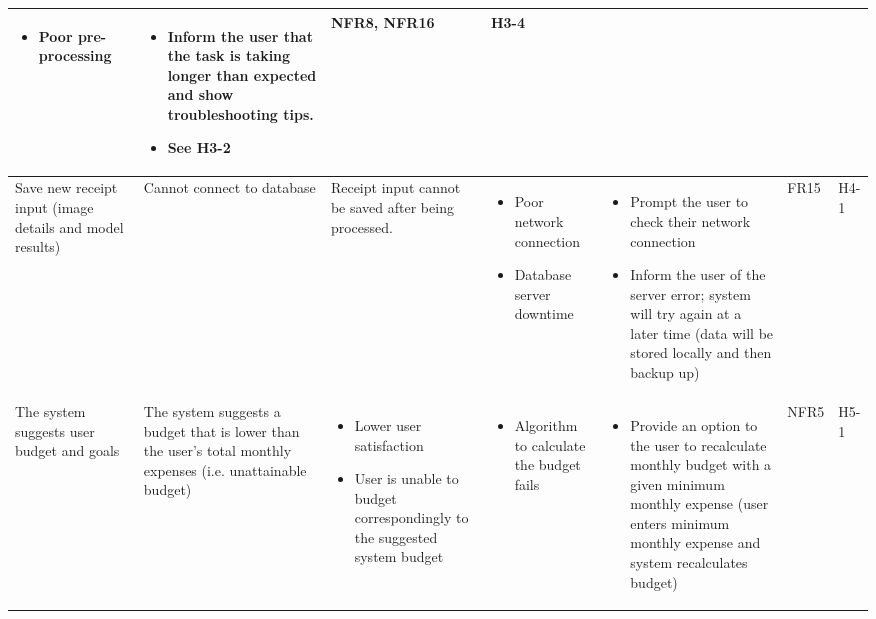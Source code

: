 \documentclass{article}
\begin{document}
\begin{landscape}
\begin{longtable}{|p{3cm}|p{4cm}|p{5cm}|p{5cm}|p{5cm}|p{1cm}|p{0.75cm}|}
\begin{itemize}[leftmargin=0.5cm]
        \item Poor pre-processing  
    \end{itemize} &
    \begin{itemize}[leftmargin=0.5cm]
        \item Inform the user that the task is taking longer than expected and show troubleshooting tips.
        \item See H3-2
    \end{itemize} &
    NFR8, NFR16 &
    H3-4\\
    \hline
    Save new receipt input (image details and model results) &
    Cannot connect to database &
    Receipt input cannot be saved after being processed. &
    \begin{itemize}[leftmargin=0.5cm]
        \item Poor network connection
        \item Database server downtime
    \end{itemize} &
    \begin{itemize}[leftmargin=0.5cm]
        \item Prompt the user to check their network connection
        \item Inform the user of the server error; system will try again at a later time (data will be stored locally and then backup up)
    \end{itemize} &
    FR15 &
    H4-1 \\
    \hline
    The system suggests user budget and goals &
    The system suggests a budget that is lower than the user's total monthly expenses (i.e. unattainable budget) &
    \begin{itemize}[leftmargin=0.5cm]
        \item Lower user satisfaction
        \item User is unable to budget correspondingly to the suggested system budget 
    \end{itemize} &
    \begin{itemize}[leftmargin=0.5cm]
        \item Algorithm to calculate the budget fails 
    \end{itemize} &
    \begin{itemize}[leftmargin=0.5cm]
        \item Provide an option to the user to recalculate monthly budget with a given minimum monthly expense (user enters minimum monthly expense and system recalculates budget) 
    \end{itemize} &
    NFR5 &
    H5-1\\
\end{longtable}
    \newpage{}
\end{landscape}
\restoregeometry
\end{document}
